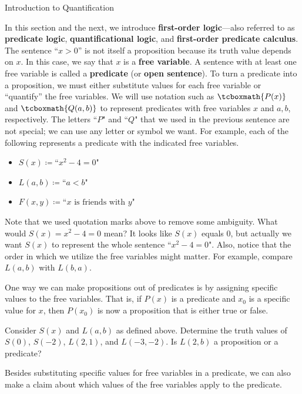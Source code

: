 \begin{section}{Introduction to Quantification}\label{sec:Introduction_to_Quantification}

In this section and the next, we introduce \textbf{first-order logic}---also referred to as \textbf{predicate logic}, \textbf{quantificational logic}, and \textbf{first-order predicate calculus}. The sentence ``$x>0$'' is not itself a proposition because its truth value depends on $x$.  In this case, we say that $x$ is a \textbf{free variable}. A sentence with at least one free variable is called a \textbf{predicate} (or \textbf{open sentence}). To turn a predicate into a proposition, we must either substitute values for each free variable or ``quantify'' the free variables. We will use notation such as $\tcboxmath{P(x)}$ and $\tcboxmath{Q(a,b)}$ to represent predicates with free variables $x$ and $a,b$, respectively. The letters ``$P$" and ``$Q$" that we used in the previous sentence are not special; we can use any letter or symbol we want. For example, each of the following represents a predicate with the indicated free variables.
\begin{itemize}
\item $S(x)\coloneqq \text{``}x^2-4=0\text{"}$
\item $L(a,b)\coloneqq \text{``}a<b\text{"}$
\item $F(x,y)\coloneqq \text{``}x \mbox{ is friends with } y\text{"}$
\end{itemize}
Note that we used quotation marks above to remove some ambiguity.  What would $S(x)=x^2-4=0$ mean?  It looks like $S(x)$ equals 0, but actually we want $S(x)$ to represent the whole sentence ``$x^2-4=0$". Also, notice that the order in which we utilize the free variables might matter.  For example, compare $L(a,b)$ with $L(b,a)$.

One way we can make propositions out of predicates is by assigning specific values to the free variables.  That is, if $P(x)$ is a predicate and $x_0$ is a specific value for $x$, then $P(x_0)$ is now a proposition that is either true or false.

\begin{problem}
Consider $S(x)$ and $L(a,b)$ as defined above. Determine the truth values of $S(0)$, $S(-2)$, $L(2,1)$, and $L(-3,-2)$. Is $L(2,b)$ a proposition or a predicate?
\end{problem}

Besides substituting specific values for free variables in a predicate, we can also make a claim about which values of the free variables apply to the predicate.


\end{section}
